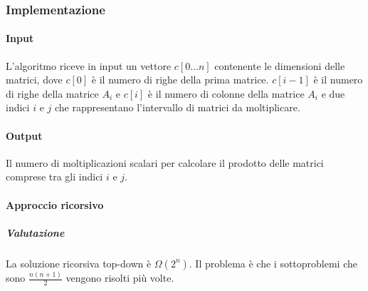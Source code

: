 \subsubsection{Implementazione}
\paragraph{Input}
L'algoritmo riceve in input un vettore $c[0\dots n]$ contenente le dimensioni delle matrici, dove $c[0]$ \`e il numero di righe della prima matrice. $c[i-1]$ \`e il numero di righe 
della matrice $A_i$ e $c[i]$ \`e il numero di colonne della matrice $A_i$ e due indici $i$ e $j$ che rappresentano l'intervallo di matrici da moltiplicare. 
\paragraph{Output}
Il numero di moltiplicazioni scalari per calcolare il prodotto delle matrici comprese tra gli indici $i$ e $j$.
\paragraph{Approccio ricorsivo}
\begin{algorithm}[H]
\DontPrintSemicolon
{}





\SetKwFunction{}{}
\SetKwFunction{}{}
\SetKwFunction{}{}
\SetKwFunction{}{}
\SetKwFunction{}{}

\caption{\protect\Int \protect{}}
\end{algorithm}
\subparagraph{Valutazione}
La soluzione ricorsiva top-down \`e $\Omega(2^n)$. Il problema \`e che i sottoproblemi che sono $\frac{n(n+1)}{2}$ vengono risolti pi\`u volte.
